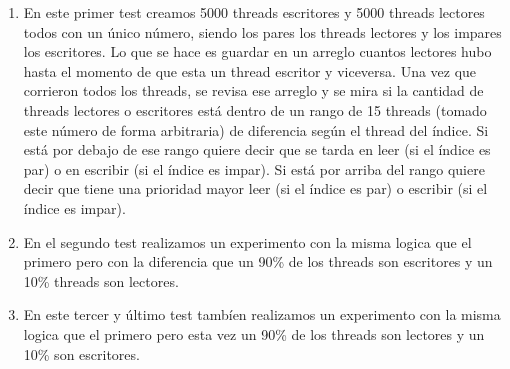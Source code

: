 \begin{enumerate}
	\item En este primer test creamos 5000 threads escritores y 5000 threads lectores todos con un único número, siendo los pares los threads lectores y los impares los escritores. Lo que se hace es guardar en un arreglo cuantos lectores hubo hasta el momento de que esta un thread escritor y viceversa.
	\newline
	Una vez que corrieron todos los threads, se revisa ese arreglo y se mira si la cantidad de threads lectores o escritores está dentro de un rango de 15 threads (tomado este número de forma arbitraria) de diferencia según el thread del índice. Si está por debajo de ese rango quiere decir que se tarda en leer (si el índice es par) o en escribir (si el índice es impar). Si está por arriba del rango quiere decir que tiene una prioridad mayor leer (si el índice es par) o escribir (si el índice es impar).

	\item En el segundo test realizamos un experimento con la misma logica que el primero pero con la diferencia que un 90\% de los threads son escritores y un 10\% threads son lectores.

	\item En este tercer y último test tambíen realizamos un experimento con la misma logica que el primero pero esta vez un 90\% de los threads son lectores y un 10\% son escritores.
\end{enumerate}